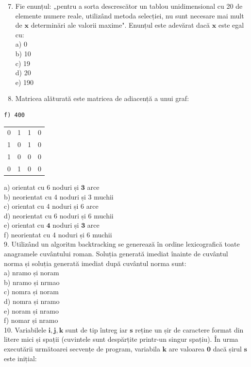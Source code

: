 \documentclass[10pt]{article}
\begin{document}
\begin{enumerate}
  \setcounter{enumi}{6}
  \item Fie enunțul: „pentru a sorta descrescător un tablou unidimensional cu 20 de elemente numere reale, utilizând metoda selecției, nu sunt necesare mai mult de $\mathbf{x}$ determinări ale valorii maxime". Enunțul este adevărat dacă $\mathbf{x}$ este egal cu:\\
a) 0\\
b) 10\\
c) 19\\
d) 20\\
e) 190
  \item Matricea alăturată este matricea de adiacență a unui graf:
\end{enumerate}

\begin{verbatim}
f) 400
\end{verbatim}

\begin{center}
\begin{tabular}{llll}
0 & 1 & 1 & 0 \\
1 & 0 & 1 & 0 \\
1 & 0 & 0 & 0 \\
0 & 1 & 0 & 0 \\
\end{tabular}
\end{center}

a) orientat cu 6 noduri și $\mathbf{3}$ arce\\
b) neorientat cu 4 noduri și 3 muchii\\
c) orientat cu 4 noduri și 6 arce\\
d) neorientat cu 6 noduri și 6 muchii\\
e) orientat cu $\mathbf{4}$ noduri și $\mathbf{3}$ arce\\
f) neorientat cu 4 noduri și 6 muchii\\
9. Utilizând un algoritm backtracking se generează în ordine lexicografică toate anagramele cuvântului roman. Soluția generată imediat înainte de cuvântul norma și soluția generată imediat după cuvântul norma sunt:\\
a) nramo și noram\\
b) nramo și nrmao\\
c) nomra și noram\\
d) nomra și nramo\\
e) noram și nramo\\
f) nomar și nramo\\
10. Variabilele $\mathbf{i}, \mathbf{j}, \mathbf{k}$ sunt de tip întreg iar $\mathbf{s}$ reține un șir de caractere format din litere mici și spații (cuvintele sunt despărțite printr-un singur spațiu). În urma executării următoarei secvențe de program, variabila $\mathbf{k}$ are valoarea $\mathbf{0}$ dacă șirul $\mathbf{s}$ este inițial:
\end{document}
